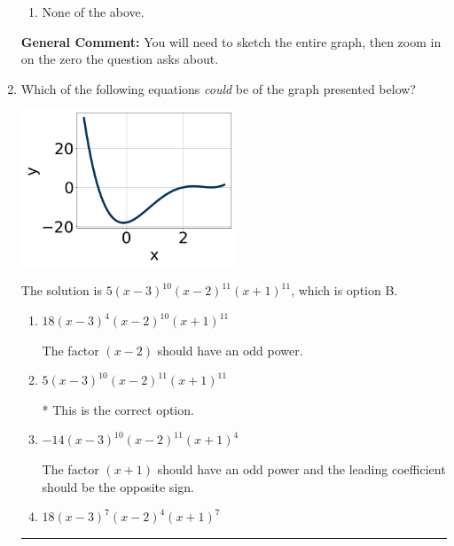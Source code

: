 \documentclass{extbook}[14pt]
\newcommand{\litem}[1]{\item #1

\rule{\textwidth}{0.4pt}}
\begin{document}
\begin{enumerate}
{\begin{enumerate}[label=\Alph*.]
\item None of the above.\end{enumerate}
\textbf{General Comment:} You will need to sketch the entire graph, then zoom in on the zero the question asks about.
}
\litem{
Which of the following equations \textit{could} be of the graph presented below?

\begin{center}
    \includegraphics[width=0.5\textwidth]{../Figures/polyGraphToFunctionCopyB.png}
\end{center}


The solution is \( 5(x - 3)^{10} (x - 2)^{11} (x + 1)^{11} \), which is option B.\begin{enumerate}[label=\Alph*.]
\item \( 18(x - 3)^{4} (x - 2)^{10} (x + 1)^{11} \)

The factor $(x - 2)$ should have an odd power.
\item \( 5(x - 3)^{10} (x - 2)^{11} (x + 1)^{11} \)

* This is the correct option.
\item \( -14(x - 3)^{10} (x - 2)^{11} (x + 1)^{4} \)

The factor $(x + 1)$ should have an odd power and the leading coefficient should be the opposite sign.
\item \( 18(x - 3)^{7} (x - 2)^{4} (x + 1)^{7} \)


\end{enumerate}}
\end{enumerate}
\end{document}
